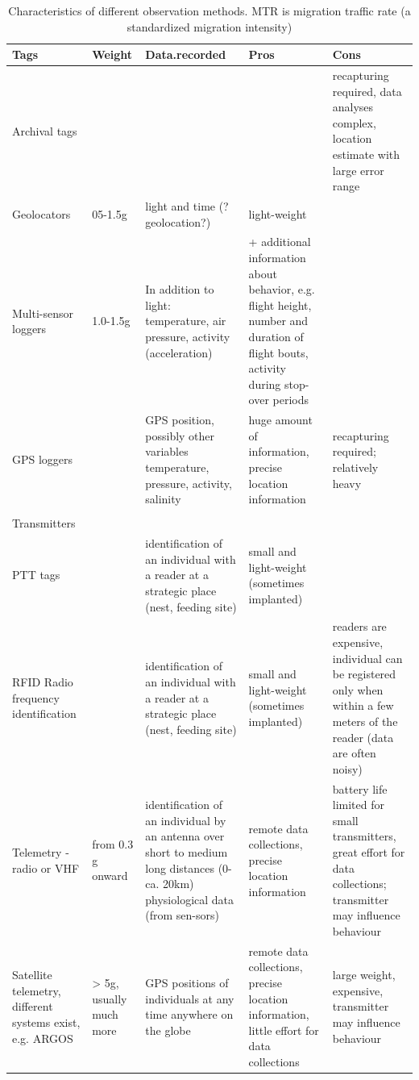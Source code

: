 \documentclass[
]{book}
\begin{document}
\begin{table}
\caption{\label{tab:nice-tab}Characteristics of different observation methods. MTR is migration traffic rate (a standardized migration intensity)}
\centering
\begin{tabular}[t]{lllll}
\toprule
Tags & Weight & Data.recorded & Pros & Cons\\
\midrule
Archival tags &  &  &  & recapturing required, data analyses complex, location estimate with large error range\\
Geolocators & 05-1.5g & light and time (?geolocation?) & light-weight & \\
Multi-sensor loggers & 1.0-1.5g & In addition to light: temperature, air pressure, activity (acceleration) & + additional information about behavior, e.g. flight height, number and duration of flight bouts, activity during stop-over periods & \\
GPS loggers &  & GPS position, possibly other variables temperature, pressure, activity, salinity & huge amount of information, precise location information & recapturing required; relatively heavy\\
 &  &  &  & \\
\addlinespace
Transmitters &  &  &  & \\
PTT tags &  & identification of an individual with a reader at a strategic place (nest, feeding site) & small and light-weight (sometimes implanted) & \\
RFID Radio frequency identification &  & identification of an individual with a reader at a strategic place (nest, feeding site) & small and light-weight (sometimes implanted) & readers are expensive, individual can be registered only when within a few meters of the reader (data are often noisy)\\
Telemetry - radio or VHF & from 0.3 g onward & identification of an individual by an antenna over short to medium long distances (0-ca. 20km)
physiological data (from sen-sors) & remote data collections, precise location information & battery life limited for small transmitters, great effort for data collections; transmitter may influence behaviour\\
Satellite telemetry, different systems exist, e.g. ARGOS & > 5g, usually much more & GPS positions of individuals at any time anywhere on the globe & remote data collections, precise location information, little effort for data collections & large weight, expensive, transmitter may influence behaviour\\
\bottomrule
\end{tabular}
\end{table}
\end{document}
